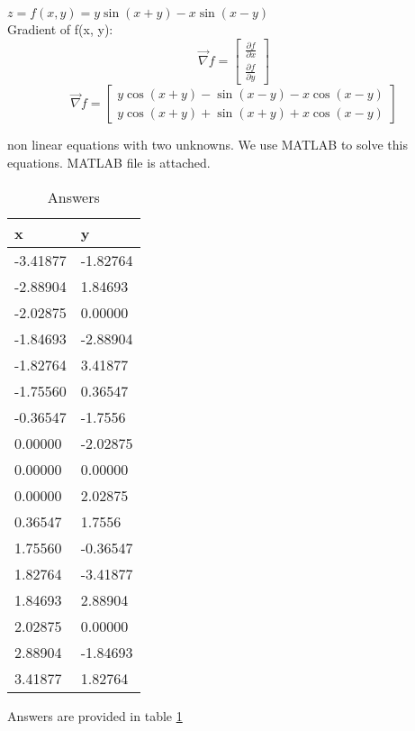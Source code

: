 $z = f(x, y) = y\sin(x+y)-x\sin(x-y)$ \\
Gradient of f(x, y):
$$\vec{\nabla} f = \begin{bmatrix}
	\frac{\partial f}{\partial x} \\[6pt]
	\frac{\partial f}{\partial y}
\end{bmatrix} $$
$$\vec{\nabla} f = \begin{bmatrix}
	y \cos(x + y) - \sin(x - y) - x  \cos(x - y) \\
	y  \cos(x + y) + \sin(x + y) + x  \cos(x - y)
\end{bmatrix} $$

non linear equations with two unknowns. We use MATLAB to solve this equations. MATLAB file is attached.
\begin{table}[h]
				\caption {Answers} \label{ans} 
	\begin{center}
		\begin{tabular}{| l | l |}
			\hline
			x & y\\ \hline
			-3.41877 & -1.82764 \\ \hline
			-2.88904 & 1.84693 \\ \hline
			-2.02875 & 0.00000 \\ \hline
			-1.84693 & -2.88904 \\ \hline
			-1.82764 & 3.41877 \\ \hline
			-1.75560 & 0.36547 \\  \hline
			-0.36547 & -1.7556 \\ \hline
			0.00000 & -2.02875 \\ \hline
			0.00000 & 0.00000 \\ \hline
			0.00000 & 2.02875 \\ \hline
			0.36547 & 1.7556 \\ \hline
			1.75560 & -0.36547 \\ \hline
			1.82764 & -3.41877 \\ \hline
			1.84693 & 2.88904 \\ \hline
			2.02875 & 0.00000 \\ \hline
			2.88904 & -1.84693 \\ \hline
			3.41877 & 1.82764 \\ \hline
		\end{tabular}
	\end{center}
\end{table}
Answers are provided in table \ref{ans}


